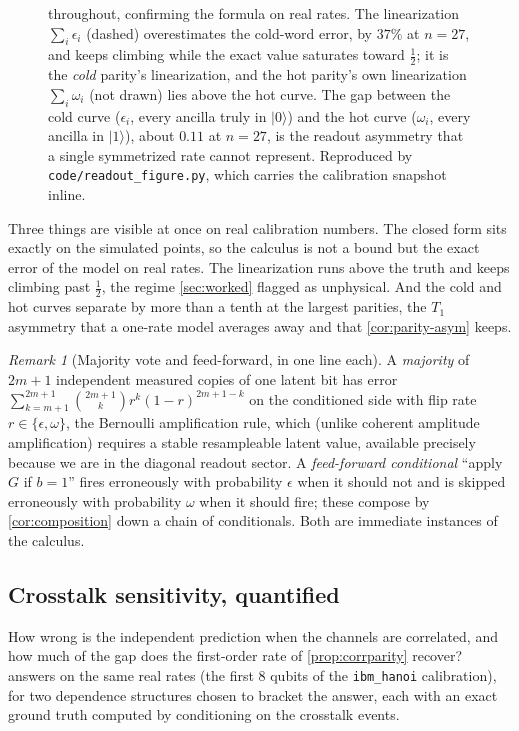 \documentclass[12pt]{article}
\numberwithin{equation}{section}
\theoremstyle{plain}
\theoremstyle{definition}
\theoremstyle{remark}
\newtheorem{remark}[theorem]{Remark}
\newcommand{\eps}{\epsilon}
\newcommand{\ket}[1]{\lvert #1 \rangle}
\begin{document}
\begin{figure}[t]
{throughout, confirming the formula on real rates. The linearization
$\sum_i \eps_i$ (dashed) overestimates the cold-word error, by $37\%$ at $n=27$,
and keeps climbing while the exact value saturates toward $\tfrac12$; it is the
\emph{cold} parity's linearization, and the hot parity's own linearization
$\sum_i \omega_i$ (not drawn) lies above the hot curve. The gap
between the cold curve ($\eps_i$, every ancilla truly in $\ket{0}$) and the hot
curve ($\omega_i$, every ancilla in $\ket{1}$), about $0.11$ at $n=27$, is the
readout asymmetry that a single symmetrized rate cannot represent. Reproduced by
\texttt{code/readout\_figure.py}, which carries the calibration snapshot inline.}
\label{fig:realcalib}
\end{figure}

Three things are visible at once on real calibration numbers. The closed form sits exactly
on the simulated points, so the calculus is not a bound but the exact error of the
model on real rates. The linearization runs above the truth and keeps climbing
past $\tfrac12$, the regime \cref{sec:worked} flagged as unphysical. And the cold
and hot curves separate by more than a tenth at the largest parities, the $T_1$
asymmetry that a one-rate model averages away and that \cref{cor:parity-asym}
keeps.

\begin{remark}[Majority vote and feed-forward, in one line each]
A \emph{majority} of $2m+1$ independent measured copies of one latent bit has
error $\sum_{k=m+1}^{2m+1}\binom{2m+1}{k} r^k (1-r)^{2m+1-k}$ on the conditioned
side with flip rate $r\in\{\eps,\omega\}$, the Bernoulli amplification rule,
which (unlike coherent amplitude amplification) requires a stable resampleable
latent value, available precisely because we are in the diagonal readout sector.
A \emph{feed-forward conditional} ``apply $G$ if $b=1$'' fires erroneously with
probability $\eps$ when it should not and is skipped erroneously with probability
$\omega$ when it should fire; these compose by \cref{cor:composition} down a
chain of conditionals. Both are immediate instances of the calculus.
\end{remark}

\subsection{Crosstalk sensitivity, quantified}
\label{sec:worked-crosstalk}

How wrong is the independent prediction when the channels are correlated, and
how much of the gap does the first-order rate of \cref{prop:corrparity}
recover?  answers on the same real rates (the first $8$
qubits of the \texttt{ibm\_hanoi} calibration), for two dependence structures
chosen to bracket the answer, each with an exact ground truth computed by
conditioning on the crosstalk events.
\end{document}
